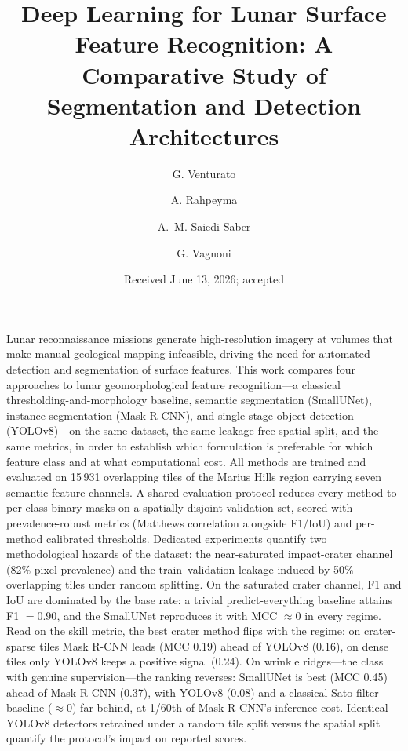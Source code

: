    \title{Deep Learning for Lunar Surface Feature Recognition:
          A Comparative Study of Segmentation and Detection Architectures}

   \author{G. Venturato
          \and
          A. Rahpeyma
          \and
          A.~M. Saiedi Saber
          \and
          G. Vagnoni
          }


   \date{Received June 13, 2026; accepted}

   \abstract
    {Lunar reconnaissance missions generate high-resolution imagery at volumes that make manual geological mapping infeasible, driving the need for automated detection and segmentation of surface features.}
    {This work compares four approaches to lunar geomorphological feature recognition---a classical thresholding-and-morphology baseline, semantic segmentation (SmallUNet), instance segmentation (Mask R-CNN), and single-stage object detection (YOLOv8)---on the same dataset, the same leakage-free spatial split, and the same metrics, in order to establish which formulation is preferable for which feature class and at what computational cost.}
    {All methods are trained and evaluated on 15\,931 overlapping tiles of the Marius Hills region carrying seven semantic feature channels. A shared evaluation protocol reduces every method to per-class binary masks on a spatially disjoint validation set, scored with prevalence-robust metrics (Matthews correlation alongside F1/IoU) and per-method calibrated thresholds. Dedicated experiments quantify two methodological hazards of the dataset: the near-saturated impact-crater channel (82\% pixel prevalence) and the train--validation leakage induced by 50\%-overlapping tiles under random splitting.}
    {On the saturated crater channel, F1 and IoU are dominated by the base rate: a trivial predict-everything baseline attains F1 $= 0.90$, and the SmallUNet reproduces it with MCC $\approx 0$ in every regime. Read on the skill metric, the best crater method flips with the regime: on crater-sparse tiles Mask R-CNN leads (MCC 0.19) ahead of YOLOv8 (0.16), on dense tiles only YOLOv8 keeps a positive signal (0.24). On wrinkle ridges---the class with genuine supervision---the ranking reverses: SmallUNet is best (MCC 0.45) ahead of Mask R-CNN (0.37), with YOLOv8 (0.08) and a classical Sato-filter baseline ($\approx 0$) far behind, at 1/60th of Mask R-CNN's inference cost. Identical YOLOv8 detectors retrained under a random tile split versus the spatial split quantify the protocol's impact on reported scores.}
